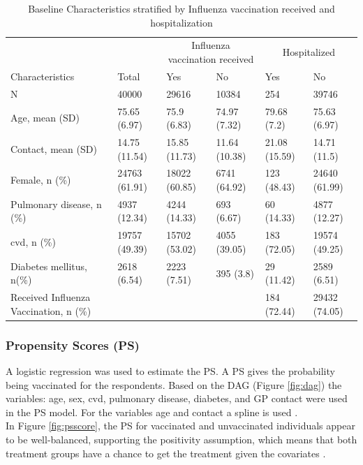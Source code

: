 \documentclass[
]{article}
\begin{document}
\begin{table}[!h]

\caption{\label{tab:des}Baseline Characteristics stratified by Influenza vaccination received and hospitalization}
\centering
\begin{tabular}[t]{llllll}
\toprule
\multicolumn{1}{c}{ } & \multicolumn{1}{c}{ } & \multicolumn{2}{c}{Influenza vaccination received} & \multicolumn{2}{c}{Hospitalized} \\
\cmidrule(l{3pt}r{3pt}){3-4} \cmidrule(l{3pt}r{3pt}){5-6}
Characteristics & Total & Yes & No & Yes & No\\
\midrule
N & 40000 & 29616 & 10384 & 254 & 39746\\
Age, mean (SD) & 75.65 (6.97) & 75.9 (6.83) & 74.97 (7.32) & 79.68 (7.2) & 75.63 (6.97)\\
Contact, mean (SD) & 14.75 (11.54) & 15.85 (11.73) & 11.64 (10.38) & 21.08 (15.59) & 14.71 (11.5)\\
Female, n (\%) & 24763 (61.91) & 18022 (60.85) & 6741 (64.92) & 123 (48.43) & 24640 (61.99)\\
Pulmonary disease, n (\%) & 4937 (12.34) & 4244 (14.33) & 693 (6.67) & 60 (14.33) & 4877 (12.27)\\
\addlinespace
cvd, n (\%) & 19757 (49.39) & 15702 (53.02) & 4055 (39.05) & 183 (72.05) & 19574 (49.25)\\
Diabetes mellitus, n(\%) & 2618 (6.54) & 2223 (7.51) & 395 (3.8) & 29 (11.42) & 2589 (6.51)\\
Received Influenza Vaccination, n (\%) &  &  &  & 184 (72.44) & 29432 (74.05)\\
\bottomrule
\end{tabular}
\end{table}

\hypertarget{propensity-scores-ps}{%
\subsubsection{Propensity Scores (PS)}\label{propensity-scores-ps}}

A logistic regression was used to estimate the PS. A PS gives the probability being vaccinated for the respondents. Based on the DAG (Figure \ref{fig:dag}) the variables: age, sex, cvd, pulmonary disease, diabetes, and GP contact were used in the PS model. For the variables age and contact a spline is used \citep{Tian}.\\
\hspace*{0.333em}\hspace*{0.333em}\hspace*{0.333em}\hspace*{0.333em}In Figure \ref{fig:psscore}, the PS for vaccinated and unvaccinated individuals appear to be well-balanced, supporting the positivity assumption, which means that both treatment groups have a chance to get the treatment given the covariates \citep{westreich}.
\end{document}
